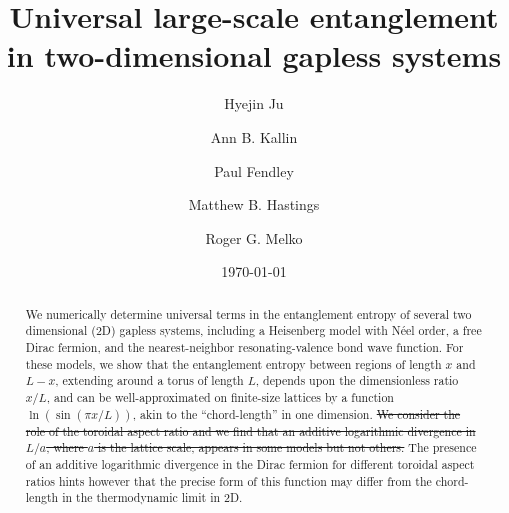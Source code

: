 \documentclass[prl,aps,twocolumn,floatfix,amsmath,amssymb,superscriptaddress,tightenlines]{revtex4}
\begin{document}
\newcommand{\be}{\begin{equation}}
\newcommand{\ee}{\end{equation}}

\date{\today}
\title{Universal large-scale entanglement in
  two-dimensional gapless systems}

\author{Hyejin Ju}

\author{Ann B. Kallin}

\author{Paul Fendley}

\author{Matthew B. Hastings}

\author{Roger G. Melko}

\begin{abstract} 
We numerically determine universal terms in the entanglement entropy of several two dimensional (2D) gapless systems, including a Heisenberg model with N\'eel order, a free Dirac fermion, and the nearest-neighbor resonating-valence bond wave function.
For these models, we show that the entanglement entropy between regions of length $x$ and $L-x$, extending around a torus of
length $L$, depends upon the dimensionless ratio $x/L$, and can be well-approximated on finite-size lattices by a function
$\ln(\sin(\pi x/L))$, akin to the ``chord-length'' in one dimension.
\sout{We consider the role of the toroidal aspect ratio and we find that an additive logarithmic divergence in $L/a$, where $a$ is the lattice scale, appears in some models but not others.}  The presence of an additive logarithmic divergence in the Dirac fermion for different toroidal aspect ratios hints however that the precise form of this function may differ from the chord-length in the thermodynamic limit in 2D.
\end{abstract}
\maketitle
\end{document}
